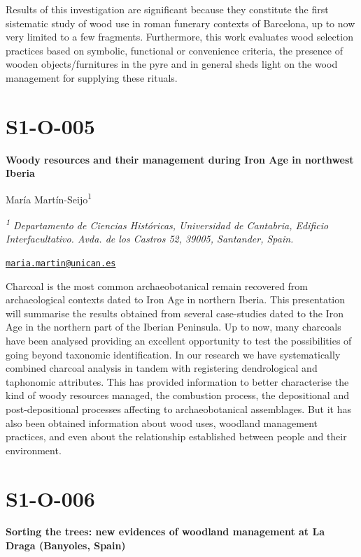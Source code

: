 \documentclass[
]{book}
\begin{document}
Results of this investigation are significant because they constitute the first sistematic study of wood use in roman funerary contexts of Barcelona, up to now very limited to a few fragments. Furthermore, this work evaluates wood selection practices based on symbolic, functional or convenience criteria, the presence of wooden objects/furnitures in the pyre and in general sheds light on the wood management for supplying these rituals.

\hypertarget{s1-o-005}{%
\section*{S1-O-005}\label{s1-o-005}}

\textbf{Woody resources and their management during Iron Age in northwest Iberia}

María Martín-Seijo\textsuperscript{1}

\emph{\textsuperscript{1} Departamento de Ciencias Históricas, Universidad de Cantabria, Edificio Interfacultativo. Avda. de los Castros 52, 39005, Santander, Spain.}

\href{mailto:maria.martin@unican.es}{\nolinkurl{maria.martin@unican.es}}

Charcoal is the most common archaeobotanical remain recovered from archaeological contexts dated to Iron Age in northern Iberia. This presentation will summarise the results obtained from several case-studies dated to the Iron Age in the northern part of the Iberian Peninsula. Up to now, many charcoals have been analysed providing an excellent opportunity to test the possibilities of going beyond taxonomic identification. In our research we have systematically combined charcoal analysis in tandem with registering dendrological and taphonomic attributes. This has provided information to better characterise the kind of woody resources managed, the combustion process, the depositional and post-depositional processes affecting to archaeobotanical assemblages. But it has also been obtained information about wood uses, woodland management practices, and even about the relationship established between people and their environment.

\hypertarget{s1-o-006}{%
\section*{S1-O-006}\label{s1-o-006}}

\textbf{Sorting the trees: new evidences of woodland management at La Draga (Banyoles, Spain)}
\end{document}
